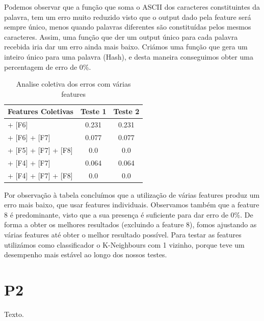 \documentclass[11pt,twocolumn]{article}
\begin{document}
    Podemos observar que a função que soma o ASCII dos caracteres
    constituintes da palavra, tem um erro muito reduzido visto que o output dado pela feature será sempre único, menos quando palavras diferentes são constituídas pelos mesmos caracteres. 
    Assim, uma função que der um output único para cada palavra recebida iria dar um erro ainda mais baixo. Criámos uma função que gera um inteiro único para uma palavra (Hash), e desta maneira conseguimos obter uma percentagem de erro de 0\%.
    
    \begin{table}[htbp]
        \centering
        \caption{Analise coletiva dos erros com várias features}
        \label{my-label}
        \begin{tabular}{|l|c|c|}
        \hline
        \multicolumn{1}{|c|}{Features Coletivas}         & \textbf{Teste 1} & \textbf{Teste 2}                    \\ \hline
        [F5] + [F6] & 0.231 & 0.231 \\ \hline
        [F5] + [F6] + [F7]     & 0.077  & 0.077                   \\ \hline
        [F4] + [F5] + [F7] + [F8]   & 0.0              & 0.0                                 \\ \hline
        [F3] + [F4] + [F7]   & 0.064             & 0.064                                 \\ \hline
        [F3] + [F4] + [F7] + [F8]   & 0.0          & 0.0                                 \\ \hline
        \end{tabular}
        \end{table}
    \par  
    Por observação à tabela concluímos que a utilização de várias features produz um erro mais baixo, que usar features individuais. 
    Observamos também que a feature 8 é predominante, visto que a sua presença é suficiente para dar erro de 0\%. De forma a obter os melhores resultados (excluindo a feature 8), fomos ajustando as várias features até obter o melhor resultado possível. Para testar as features utilizámos 
    como classificador o K-Neighbours com 1 vizinho, porque teve um desempenho mais estável ao longo dos nossos testes.

\section*{P2}

Texto.
\end{document}
